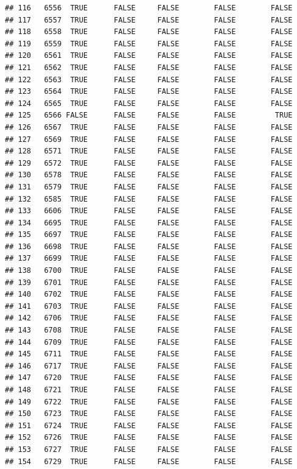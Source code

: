 \documentclass[
  10pt,
  b5paper,
  oneside]{book}
\begin{document}
\begin{verbatim}
## 116   6556  TRUE      FALSE     FALSE        FALSE        FALSE
## 117   6557  TRUE      FALSE     FALSE        FALSE        FALSE
## 118   6558  TRUE      FALSE     FALSE        FALSE        FALSE
## 119   6559  TRUE      FALSE     FALSE        FALSE        FALSE
## 120   6561  TRUE      FALSE     FALSE        FALSE        FALSE
## 121   6562  TRUE      FALSE     FALSE        FALSE        FALSE
## 122   6563  TRUE      FALSE     FALSE        FALSE        FALSE
## 123   6564  TRUE      FALSE     FALSE        FALSE        FALSE
## 124   6565  TRUE      FALSE     FALSE        FALSE        FALSE
## 125   6566 FALSE      FALSE     FALSE        FALSE         TRUE
## 126   6567  TRUE      FALSE     FALSE        FALSE        FALSE
## 127   6569  TRUE      FALSE     FALSE        FALSE        FALSE
## 128   6571  TRUE      FALSE     FALSE        FALSE        FALSE
## 129   6572  TRUE      FALSE     FALSE        FALSE        FALSE
## 130   6578  TRUE      FALSE     FALSE        FALSE        FALSE
## 131   6579  TRUE      FALSE     FALSE        FALSE        FALSE
## 132   6585  TRUE      FALSE     FALSE        FALSE        FALSE
## 133   6606  TRUE      FALSE     FALSE        FALSE        FALSE
## 134   6695  TRUE      FALSE     FALSE        FALSE        FALSE
## 135   6697  TRUE      FALSE     FALSE        FALSE        FALSE
## 136   6698  TRUE      FALSE     FALSE        FALSE        FALSE
## 137   6699  TRUE      FALSE     FALSE        FALSE        FALSE
## 138   6700  TRUE      FALSE     FALSE        FALSE        FALSE
## 139   6701  TRUE      FALSE     FALSE        FALSE        FALSE
## 140   6702  TRUE      FALSE     FALSE        FALSE        FALSE
## 141   6703  TRUE      FALSE     FALSE        FALSE        FALSE
## 142   6706  TRUE      FALSE     FALSE        FALSE        FALSE
## 143   6708  TRUE      FALSE     FALSE        FALSE        FALSE
## 144   6709  TRUE      FALSE     FALSE        FALSE        FALSE
## 145   6711  TRUE      FALSE     FALSE        FALSE        FALSE
## 146   6717  TRUE      FALSE     FALSE        FALSE        FALSE
## 147   6720  TRUE      FALSE     FALSE        FALSE        FALSE
## 148   6721  TRUE      FALSE     FALSE        FALSE        FALSE
## 149   6722  TRUE      FALSE     FALSE        FALSE        FALSE
## 150   6723  TRUE      FALSE     FALSE        FALSE        FALSE
## 151   6724  TRUE      FALSE     FALSE        FALSE        FALSE
## 152   6726  TRUE      FALSE     FALSE        FALSE        FALSE
## 153   6727  TRUE      FALSE     FALSE        FALSE        FALSE
## 154   6729  TRUE      FALSE     FALSE        FALSE        FALSE

\end{verbatim}
\end{document}
